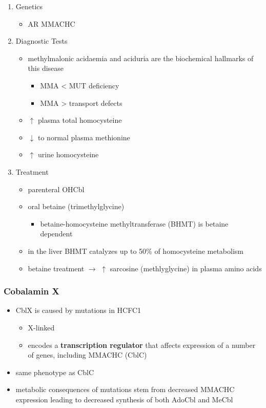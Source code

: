 \documentclass[12pt]{scrartcl}
\begin{document}
\begin{enumerate}
\item Genetics
\label{sec:org8003d46}
\begin{itemize}
\item AR MMACHC
\end{itemize}

\item Diagnostic Tests
\label{sec:org3ac1cff}
\begin{itemize}
\item methylmalonic acidaemia and aciduria are the
biochemical hallmarks of this disease
\begin{itemize}
\item MMA \textless{} MUT deficiency
\item MMA \textgreater{} transport defects
\end{itemize}
\item \(\uparrow\) plasma total homocysteine
\item \(\downarrow\) to normal plasma methionine
\item \(\uparrow\) urine homocysteine
\end{itemize}

\item Treatment
\label{sec:org2cc4330}
\begin{itemize}
\item parenteral OHCbl
\item oral betaine (trimethylglycine)
\begin{itemize}
\item betaine-homocysteine methyltransferase (BHMT) is betaine dependent
\end{itemize}
\end{itemize}


\begin{itemize}
\item in the liver BHMT catalyzes up to 50\% of homocysteine metabolism
\item betaine treatment \(\to\) \(\uparrow\) sarcosine (methlyglycine) in plasma amino acids
\end{itemize}
\end{enumerate}

\subsubsection{Cobalamin X}
\label{sec:orgd4192e8}
\begin{itemize}
\item CblX is caused by mutations in HCFC1
\begin{itemize}
\item X-linked
\item encodes a \textbf{transcription regulator} that affects expression of a
number of genes, including MMACHC (CblC)
\end{itemize}
\item same phenotype as CblC
\item metabolic consequences of mutations stem from decreased MMACHC
expression leading to decreased synthesis of both AdoCbl and MeCbl
\end{itemize}
\end{document}
